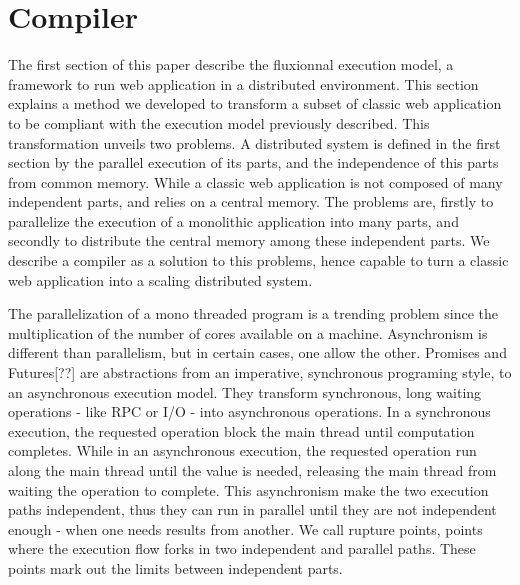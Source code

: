 \section{Compiler} \label{section:compiler}

The first section of this paper describe the fluxionnal execution model, a framework to run web application in a distributed environment.
This section explains a method we developed to transform a subset of classic web application to be compliant with the execution model previously described.
This transformation unveils two problems.
A distributed system is defined in the first section by the parallel execution of its parts, and the independence of this parts from common memory.
While a classic web application is not composed of many independent parts, and relies on a central memory.
The problems are, firstly to parallelize the execution of a monolithic application into many parts, and secondly to distribute the central memory among these independent parts.
We describe a compiler as a solution to this problems, hence capable to turn a classic web application into a scaling distributed system. 

The parallelization of a mono threaded program is a trending problem since the multiplication of the number of cores available on a machine.
Asynchronism is different than parallelism, but in certain cases, one allow the other.
Promises\cite{Liskov1988} and Futures[??] are abstractions from an imperative, synchronous programing style, to an asynchronous execution model.
They transform synchronous, long waiting operations - like RPC or I/O - into asynchronous operations.
In a synchronous execution, the requested operation block the main thread until computation completes.
While in an asynchronous execution, the requested operation run along the main thread until the value is needed, releasing the main thread from waiting the operation to complete.
This asynchronism make the two execution paths independent, thus they can run in parallel until they are not independent enough - when one needs results from another.
We call rupture points, points where the execution flow forks in two independent and parallel paths.
These points mark out the limits between independent parts.

